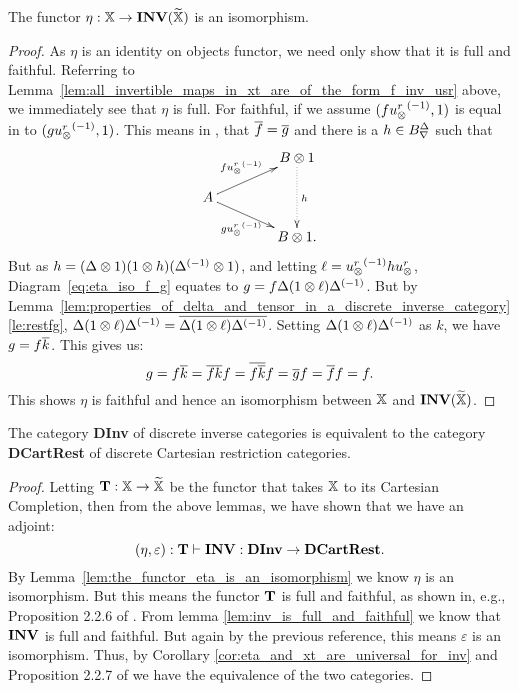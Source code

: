 \begin{lemma}\label{lem:the_functor_eta_is_an_isomorphism}
  The functor $\eta:\mathbb{X} \to \mathbf{INV}({\widetilde{\mathbb{X}}})$ is an isomorphism.
\end{lemma}
\begin{proof}
  As $\eta$ is an identity on objects functor, we need only show that it is full and faithful.
  Referring to Lemma~\ref{lem:all_invertible_maps_in_xt_are_of_the_form_f_inv_usr} above, we
  immediately see that $\eta$ is full. For faithful, if we assume $(f{u_{\otimes}^r}^{(-1)},1)$ is equal in \Xt
  to $(g{u_{\otimes}^r}^{(-1)},1)$. This means in \X, that $\overline{f} = \overline{g}$ and there is a $h\in{B}^{\Delta}_{\nabla}$ such that
  \begin{equation}
    \xymatrix @C=40pt @R=15pt{
      & B \* 1 \ar@{.>}[dd]^{h} \\
      A \ar[ur]^{f\inv{\usr}} \ar[dr]_{g\inv{\usr}}\\
      & B\* 1.
    }\label{eq:eta_iso_f_g}
  \end{equation}
  But as $h = (\Delta\otimes1)(1\otimes h)({\Delta}^{(-1)}\otimes1)$, and letting $\ell =  {u_{\otimes}^r}^{(-1)}hu_{\otimes}^r$,
  Diagram~\ref{eq:eta_iso_f_g} equates to $g = f \Delta (1\otimes\ell) {\Delta}^{(-1)}$. But by
  Lemma~\ref{lem:properties_of_delta_and_tensor_in_a_discrete_inverse_category}\ref{le:restfg},
  $\Delta (1\otimes \ell) {\Delta}^{(-1)} = \overline{\Delta (1\otimes \ell) {\Delta}^{(-1)}}$. Setting $\Delta (1\otimes \ell)
  {\Delta}^{(-1)}$ as $k$, we have $g = f \overline{k}$. This gives us:
  \[
    g = f \overline{k} = \overline{f k} f = \overline{f \overline{k}} f = \overline{g} f = \overline{f} f = f.
  \]
  This shows $\eta$ is faithful and hence an isomorphism between $\mathbb{X}$ and $\mathbf{INV}({\widetilde{\mathbb{X}}})$.
\end{proof}

\begin{theorem}\label{thm:discrete_inverse_categories_are_equivalent_to_discrete_restriction_categories}
  The category \textbf{DInv} of discrete inverse categories is equivalent to the category
  \textbf{DCartRest} of discrete Cartesian restriction categories.
\end{theorem}
\begin{proof}
  Letting $\mathbf{T}:\mathbb{X} \to \widetilde{\mathbb{X}}$ be the functor that takes $\mathbb{X}$ to its Cartesian Completion, then from the
  above lemmas, we have shown that we have an adjoint:
  \begin{equation}
    (\eta,\varepsilon):\mathbf{T} \vdash \mathbf{INV} :\text{\textbf{DInv}} \to \text{\textbf{DCartRest}}. \label{eq:inv_and_wtf_are_adjoint_pair}
  \end{equation}
  By Lemma~\ref{lem:the_functor_eta_is_an_isomorphism} we know $\eta$ is an isomorphism. But this
  means the functor $\mathbf{T}$ is full and faithful, as shown in, e.g., Proposition 2.2.6 of
  \cite{cockett2009:ctcs}. From lemma \ref{lem:inv_is_full_and_faithful} we know that $\mathbf{INV}$ is
  full and faithful. But again by the previous reference, this means $\varepsilon$ is an
  isomorphism. Thus, by Corollary \ref{cor:eta_and_xt_are_universal_for_inv} and Proposition 2.2.7
  of \cite{cockett2009:ctcs} we have the equivalence of the two categories.
\end{proof}

